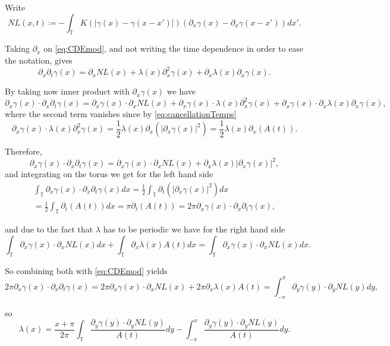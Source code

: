 \documentclass[a4paper]{amsart}
\theoremstyle{definition}
\newcommand{\T}{\ensuremath{\mathbb{T}}}
\begin{document}
    Write $$NL(x,t)\coloneqq -\int_\T K(|\gamma(x)-\gamma(x-x')|)(\partial_x \gamma(x)-\partial_x \gamma(x-x'))dx'.$$

    Taking $\partial_x$ on \eqref{eq:CDEmod}, and not writing the time dependence in order to ease the notation, gives
    $$\partial_x \partial_t \gamma(x) = \partial_x NL(x) + \lambda (x) \partial_x^2\gamma(x) + \partial_x\lambda(x) \partial_x \gamma(x).$$

    By taking now inner product with $\partial_x\gamma(x)$  we have
    $$\partial_x\gamma(x)\cdot \partial_x \partial_t \gamma(x) = \partial_x\gamma(x)\cdot \partial_x NL(x) + \partial_x\gamma(x)\cdot\lambda (x) \partial_x^2\gamma(x) + \partial_x\gamma(x)\cdot\partial_x\lambda(x) \partial_x \gamma(x),$$
    where the second term vanishes since by \eqref{eq:cancellationTemps} $$\partial_x\gamma(x)\cdot\lambda (x) \partial_x^2\gamma(x)=\frac{1}{2}\lambda(x) \partial_x(|\partial_x \gamma(x)|^2)=\frac{1}{2}\lambda(x) \partial_x(A(t)).$$

    Therefore, 
     $$\partial_x\gamma(x)\cdot \partial_x \partial_t \gamma(x) = \partial_x\gamma(x)\cdot \partial_x NL(x) + \partial_x\lambda(x) |\partial_x \gamma(x)|^2,$$ and integrating on the torus we get for the left hand side
     \begin{multline*}
         \int_\T \partial_x\gamma(x)\cdot \partial_x \partial_t \gamma(x) dx = \frac{1}{2}\int_\T  \partial_t (|\partial_x \gamma(x)|^2) dx \\= \frac{1}{2}\int_\T  \partial_t (A(t)) dx = \pi\partial_t (A(t)) =2\pi \partial_x\gamma(x)\cdot \partial_x\partial_t\gamma(x), 
     \end{multline*}
     

    and due to the fact that $\lambda$ has to be periodic we have for the right hand side
    $$\int_\T \partial_x\gamma(x)\cdot \partial_x NL(x)dx + \int_\T \partial_x\lambda(x) A(t) dx = \int_\T \partial_x\gamma(x)\cdot \partial_x NL(x)dx.$$

    So combining both with \eqref{eq:CDEmod} yields $$2\pi \partial_x\gamma(x)\cdot \partial_x\partial_t\gamma(x)= 2\pi \partial_x\gamma(x)\cdot \partial_x NL(x)+2\pi \partial_x \lambda(x) A(t) = \int_{-\pi}^\pi \partial_y\gamma(y)\cdot \partial_y NL(y)dy,$$

    so 
    \begin{equation} \label{eq:lambda}
        \lambda(x)=\frac{x+\pi}{2\pi} \int_\T \frac{\partial_y \gamma(y) \cdot \partial_y NL(y)}{A(t)} dy - \int_{-\pi}^x \frac{\partial_y \gamma(y)\cdot \partial_y NL(y)}{A(t)}dy.
    \end{equation}
\end{document}
